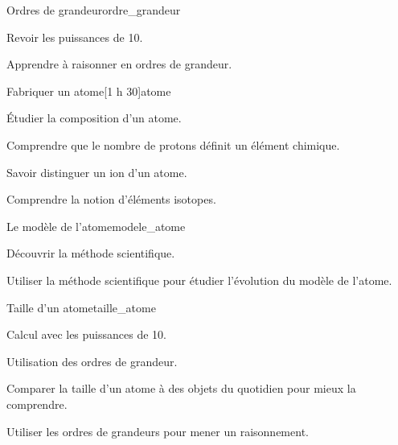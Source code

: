 \begin{multicols}{2}
  \begin{activite}{Ordres de grandeur}{ordre_grandeur}
    \begin{objectifs}  
      \item Revoir les puissances de 10.
      \item Apprendre à raisonner en ordres de grandeur.
    \end{objectifs}
  \end{activite}

  \begin{TP}{Fabriquer un atome}[1 h 30]{atome}
    \begin{objectifs}
      \item Étudier la composition d'un atome.
      \item Comprendre que le nombre de protons définit un élément chimique.
      \item Savoir distinguer un ion d'un atome.
      \item Comprendre la notion d'éléments isotopes.
    \end{objectifs}
  \end{TP}
  
  \begin{TP}{Le modèle de l'atome}{modele_atome}
    \begin{objectifs}
        \item Découvrir la méthode scientifique.
        \item Utiliser la méthode scientifique pour étudier l'évolution du modèle de l'atome.
    \end{objectifs}
  \end{TP}
  
  \begin{activite}{Taille d'un atome}{taille_atome}
    \begin{prerequis}
      \item Calcul avec les puissances de 10.
      \item Utilisation des ordres de grandeur.
    \end{prerequis}
    \begin{objectifs}
      \item Comparer la taille d'un atome à des objets du quotidien pour mieux la comprendre.
      \item Utiliser les ordres de grandeurs pour mener un raisonnement.
    \end{objectifs}
  \end{activite}
\end{multicols}

